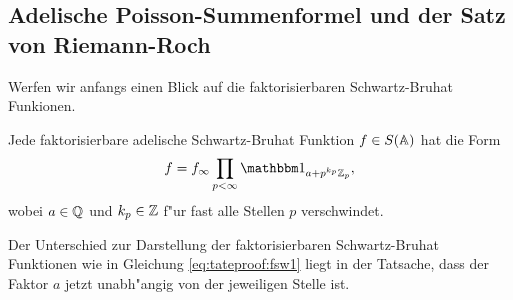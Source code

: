 	
\subsection{Adelische Poisson-Summenformel und der Satz von Riemann-Roch}

	Werfen wir anfangs einen Blick auf die faktorisierbaren Schwartz-Bruhat Funkionen.
	\begin{lemma}\label{lemma:global:sbf}
		Jede faktorisierbare adelische Schwartz-Bruhat Funktion $f\in S(\mathbb{A})$ hat die Form
		\begin{align*}
			f = f_\infty\prod_{p<\infty} \ind_{a+p^{k_p}\Zp},
		\end{align*}
		wobei $a\in\mathbb{Q}$ und $k_p\in \mathbb{Z}$ f"ur fast alle Stellen $p$ verschwindet.
	\end{lemma}
	Der Unterschied zur Darstellung der faktorisierbaren Schwartz-Bruhat Funktionen wie in Gleichung \eqref{eq:tateproof:fsw1} liegt in der Tatsache, dass der Faktor $a$ jetzt unabh"angig von der jeweiligen Stelle ist.
